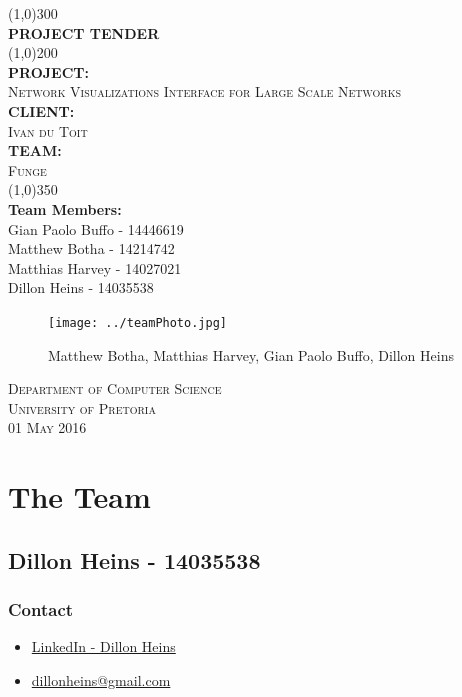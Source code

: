 \documentclass{article}
\begin{document}
\begin{titlepage}
	\begin{center}
		\line(1,0){300}\\
		[6mm]
		\huge{\bfseries PROJECT TENDER}\\
		[2mm]
		\line(1,0){200}\\
		[5mm]
		\large\textbf{PROJECT:}\\\textsc{Network Visualizations Interface for Large Scale Networks}\\
		[3mm]
		\large\textbf{CLIENT:}\\\textsc{Ivan du Toit}\\
		[3mm]
		\large \textbf{TEAM:}\\\textsc{Funge}\\
		\line(1,0){350}\\
		[5mm]
		\large \textbf{Team Members:}\\
		[3mm]
		\large Gian Paolo Buffo - 14446619\\
		\large Matthew Botha - 14214742\\
		\large Matthias Harvey - 14027021\\
        \large Dillon Heins - 14035538\\[3mm]
		\begin{figure}[H]
			\centering
			\texttt{[image: ../teamPhoto.jpg]}
			\caption{Matthew Botha, Matthias Harvey, Gian Paolo Buffo, Dillon Heins}
		\end{figure}
    \end{center}

	\vspace{7mm}

    \begin{flushright}
        \textsc{\large Department of Computer Science\\
        University of Pretoria\\
        01 May 2016\\}
    \end{flushright}
\end{titlepage}

\section{The Team}
	\subsection{Dillon Heins - 14035538}
	\subsubsection{Contact}
		\begin{itemize}
			\item \href{https://za.linkedin.com/in/dillon-heins-54275810a}{LinkedIn - Dillon Heins}
			\item \href{mailto:dillonheins@gmail.com}{dillonheins@gmail.com}	
		\end{itemize}
\end{document}
